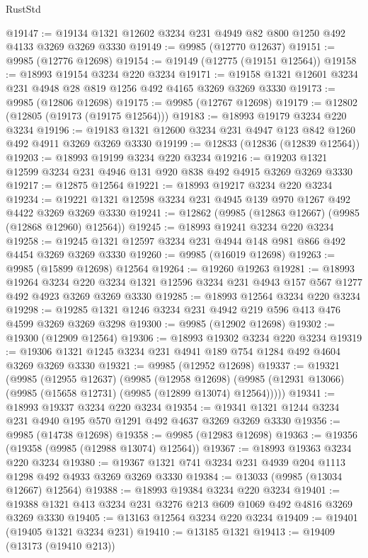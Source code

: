 \begin{lexlean}{RustStd}
\begin{coremodule}
@19147 := @19134 @1321 @12602 @3234 @231 @4949 @82 @800 @1250 @492 @4133 @3269 @3269 @3330
@19149 := @9985 (@12770 @12637)
@19151 := @9985 (@12776 @12698)
@19154 := @19149 (@12775 (@19151 @12564))
@19158 := @18993 @19154 @3234 @220 @3234
@19171 := @19158 @1321 @12601 @3234 @231 @4948 @28 @819 @1256 @492 @4165 @3269 @3269 @3330
@19173 := @9985 (@12806 @12698)
@19175 := @9985 (@12767 @12698)
@19179 := @12802 (@12805 (@19173 (@19175 @12564)))
@19183 := @18993 @19179 @3234 @220 @3234
@19196 := @19183 @1321 @12600 @3234 @231 @4947 @123 @842 @1260 @492 @4911 @3269 @3269 @3330
@19199 := @12833 (@12836 (@12839 @12564))
@19203 := @18993 @19199 @3234 @220 @3234
@19216 := @19203 @1321 @12599 @3234 @231 @4946 @131 @920 @838 @492 @4915 @3269 @3269 @3330
@19217 := @12875 @12564
@19221 := @18993 @19217 @3234 @220 @3234
@19234 := @19221 @1321 @12598 @3234 @231 @4945 @139 @970 @1267 @492 @4422 @3269 @3269 @3330
@19241 := @12862 (@9985 (@12863 @12667) (@9985 (@12868 @12960) @12564))
@19245 := @18993 @19241 @3234 @220 @3234
@19258 := @19245 @1321 @12597 @3234 @231 @4944 @148 @981 @866 @492 @4454 @3269 @3269 @3330
@19260 := @9985 (@16019 @12698)
@19263 := @9985 (@15899 @12698) @12564
@19264 := @19260 @19263
@19281 := @18993
    @19264
    @3234
    @220
    @3234
    @1321
    @12596
    @3234
    @231
    @4943
    @157
    @567
    @1277
    @492
    @4923
    @3269
    @3269
    @3330
@19285 := @18993 @12564 @3234 @220 @3234
@19298 := @19285 @1321 @1246 @3234 @231 @4942 @219 @596 @413 @476 @4599 @3269 @3269 @3298
@19300 := @9985 (@12902 @12698)
@19302 := @19300 (@12909 @12564)
@19306 := @18993 @19302 @3234 @220 @3234
@19319 := @19306 @1321 @1245 @3234 @231 @4941 @189 @754 @1284 @492 @4604 @3269 @3269 @3330
@19321 := @9985 (@12952 @12698)
@19337 := @19321
    (@9985
      (@12955 @12637)
      (@9985
        (@12958 @12698)
        (@9985 (@12931 @13066) (@9985 (@15658 @12731) (@9985 (@12899 @13074) @12564)))))
@19341 := @18993 @19337 @3234 @220 @3234
@19354 := @19341 @1321 @1244 @3234 @231 @4940 @195 @570 @1291 @492 @4637 @3269 @3269 @3330
@19356 := @9985 (@14738 @12698)
@19358 := @9985 (@12983 @12698)
@19363 := @19356 (@19358 (@9985 (@12988 @13074) @12564))
@19367 := @18993 @19363 @3234 @220 @3234
@19380 := @19367 @1321 @741 @3234 @231 @4939 @204 @1113 @1298 @492 @4933 @3269 @3269 @3330
@19384 := @13033 (@9985 (@13034 @12667) @12564)
@19388 := @18993 @19384 @3234 @220 @3234
@19401 := @19388 @1321 @413 @3234 @231 @3276 @213 @609 @1069 @492 @4816 @3269 @3269 @3330
@19405 := @13163 @12564 @3234 @220 @3234
@19409 := @19401 (@19405 @1321 @3234 @231)
@19410 := @13185 @1321
@19413 := @19409 (@13173 (@19410 @213))

\end{coremodule}
\end{lexlean}
